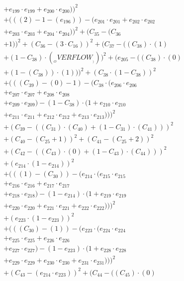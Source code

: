 \documentclass[10pt, a4paper]{article}
\begin{document}
\begin{align*}
& + e_{199} \cdot e_{199} + e_{200} \cdot e_{200}))^{2} \\
& + (((2) - 1 - (e_{196})) - (e_{201} \cdot e_{201} + e_{202} \cdot e_{202} \\
& + e_{203} \cdot e_{203} + e_{204} \cdot e_{204}))^{2} + (C_{35} - (C_{36} \\
& + 1))^{2} + (C_{36} - (3  \cdot  C_{16}))^{2} + (C_{37} - ((C_{38})  \cdot  (1) \\
& + (1 - C_{38})  \cdot  (__OVERFLOW__)))^{2} + (e_{205} - ((C_{38}) \cdot (0) \\
& + (1 - (C_{38})) \cdot (1)))^{2} + (C_{38} \cdot (1 - C_{38}))^{2} \\
& + (((C_{39}) - (0) - 1) - (C_{38} \cdot (e_{206} \cdot e_{206} \\
& + e_{207} \cdot e_{207} + e_{208} \cdot e_{208} \\
& + e_{209} \cdot e_{209}) - (1 - C_{38}) \cdot (1 + e_{210} \cdot e_{210} \\
& + e_{211} \cdot e_{211} + e_{212} \cdot e_{212} + e_{213} \cdot e_{213})))^{2} \\
& + (C_{39} - ((C_{31})  \cdot  (C_{40}) + (1 - C_{31})  \cdot  (C_{41})))^{2} \\
& + (C_{40} - (C_{25} + 1))^{2} + (C_{41} - (C_{25} + 2))^{2} \\
& + (C_{42} - ((C_{43})  \cdot  (0) + (1 - C_{43})  \cdot  (C_{44})))^{2} \\
& + (e_{214} \cdot (1 - e_{214}))^{2} \\
& + (((1) - (C_{30})) - (e_{214} \cdot (e_{215} \cdot e_{215} \\
& + e_{216} \cdot e_{216} + e_{217} \cdot e_{217} \\
& + e_{218} \cdot e_{218}) - (1 - e_{214}) \cdot (1 + e_{219} \cdot e_{219} \\
& + e_{220} \cdot e_{220} + e_{221} \cdot e_{221} + e_{222} \cdot e_{222})))^{2} \\
& + (e_{223} \cdot (1 - e_{223}))^{2} \\
& + (((C_{30}) - (1)) - (e_{223} \cdot (e_{224} \cdot e_{224} \\
& + e_{225} \cdot e_{225} + e_{226} \cdot e_{226} \\
& + e_{227} \cdot e_{227}) - (1 - e_{223}) \cdot (1 + e_{228} \cdot e_{228} \\
& + e_{229} \cdot e_{229} + e_{230} \cdot e_{230} + e_{231} \cdot e_{231})))^{2} \\
& + (C_{43} - (e_{214} \cdot e_{223}))^{2} + (C_{44} - ((C_{45})  \cdot  (0) \\

\end{align*}
\end{document}
